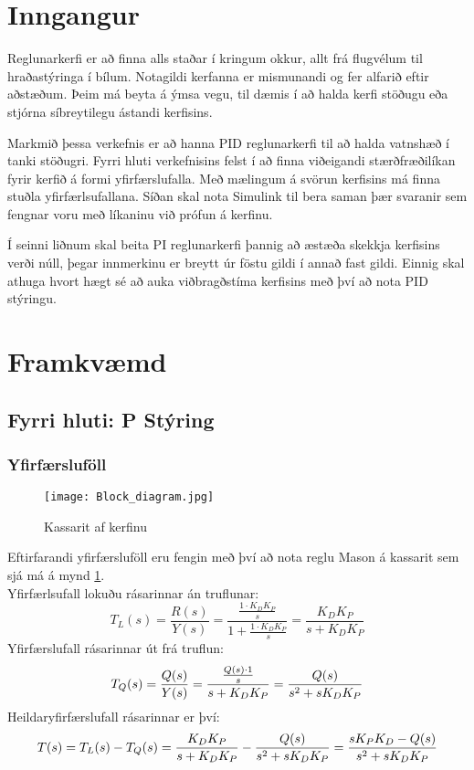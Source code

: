 \documentclass[12pt,final]{rureport}
\begin{document}
\maketitle  %
\listoffixmes

\section{Inngangur}
	Reglunarkerfi er að finna alls staðar í kringum okkur, allt frá flugvélum til hraðastýringa í bílum. Notagildi kerfanna er mismunandi og fer alfarið eftir aðstæðum. Þeim má beyta á ýmsa vegu, til dæmis í að halda kerfi stöðugu eða stjórna síbreytilegu ástandi kerfisins.
	
	Markmið þessa verkefnis er að hanna PID reglunarkerfi til að halda vatnshæð í tanki stöðugri. Fyrri hluti verkefnisins felst í að finna viðeigandi stærðfræðilíkan fyrir kerfið á formi yfirfærslufalla. Með mælingum á svörun kerfisins má finna stuðla yfirfærlsufallana. Síðan skal nota Simulink til bera saman þær svaranir sem fengnar voru með líkaninu við prófun á kerfinu.
	
	Í seinni liðnum skal beita PI reglunarkerfi þannig að æstæða skekkja kerfisins verði núll, þegar innmerkinu er breytt úr föstu gildi í annað fast gildi. Einnig skal athuga hvort hægt sé að auka viðbragðstíma kerfisins með því að nota PID stýringu.


\section{Framkvæmd}
	\subsection{Fyrri hluti: P Stýring}
	\subsubsection{Yfirfærsluföll}
	\begin{figure}[h]
		\texttt{[image: Block\_diagram.jpg]}
		\caption{Kassarit af kerfinu}
		\label{fig:blockrit}
	\end{figure}
	\hspace{-21pt}
	Eftirfarandi yfirfærsluföll eru fengin með því að nota reglu Mason á kassarit sem sjá má á mynd \ref{fig:blockrit}.\\
	Yfirfærlsufall lokuðu rásarinnar án truflunar:
	\[
		T_L(s) = \frac{R(s)}{Y(s)} = \frac{\frac{1 \cdot K_D K_P}{s}}{1 + \frac{1 \cdot K_D K_P}{s}} = \frac{K_D K_P}{s + K_D K_P}
	\]
	Yfirfærslufall rásarinnar út frá truflun:
	\[
		T_Q(s) = {Q(s) \over Y(s)} = \frac{{Q(s) \cdot 1 \over s}}{s + K_D K_P} = {Q(s) \over s^2 + s K_D K_P}
	\]
	Heildaryfirfærslufall rásarinnar er því:
	\[
		T(s) = T_L(s) - T_Q(s) = \frac{K_D K_P}{s + K_D K_P} - {Q(s) \over s^2 + s K_D K_P} = \frac{s K_P K_D - Q(s)}{s^2 + s K_D K_P}
	\]
	
\end{document}
